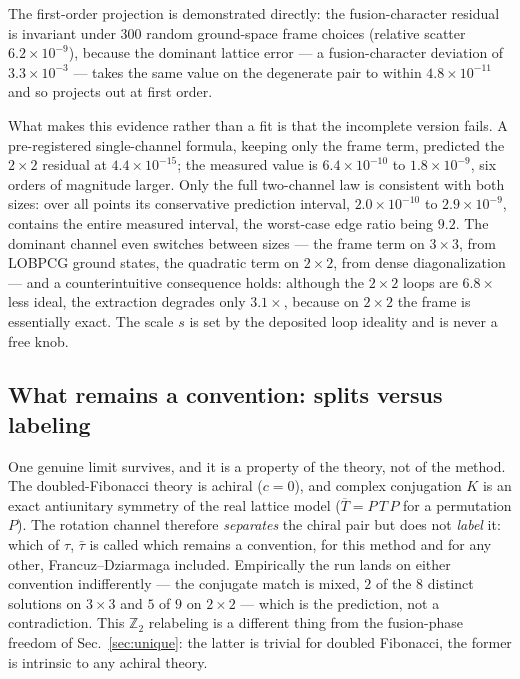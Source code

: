 \documentclass[aps,pra,twocolumn,superscriptaddress,longbibliography,floatfix,nofootinbib]{revtex4-2}
\begin{document}
The first-order projection is demonstrated directly: the fusion-character
residual is invariant under $300$ random ground-space frame choices (relative
scatter $6.2\times10^{-9}$), because the dominant lattice error --- a
fusion-character deviation of $3.3\times10^{-3}$ --- takes the same value on the
degenerate pair to within $4.8\times10^{-11}$ and so projects out at first
order.

What makes this evidence rather than a fit is that the incomplete version
fails. A pre-registered single-channel formula, keeping only the frame term,
predicted the $2\times2$ residual at $4.4\times10^{-15}$; the measured value is
$6.4\times10^{-10}$ to $1.8\times10^{-9}$, six orders of magnitude larger. Only
the full two-channel law is consistent with both sizes: over all points its
conservative prediction interval, $2.0\times10^{-10}$ to $2.9\times10^{-9}$,
contains the entire measured interval, the worst-case edge ratio being $9.2$.
The dominant channel even switches between sizes --- the frame term on
$3\times3$, from LOBPCG ground states, the quadratic term on $2\times2$, from
dense diagonalization --- and a counterintuitive consequence holds: although
the $2\times2$ loops are $6.8\times$ less ideal, the extraction degrades only
$3.1\times$, because on $2\times2$ the frame is essentially exact. The scale $s$
is set by the deposited loop ideality and is never a free knob.

\subsection{What remains a convention: splits versus labeling}
\label{sec:splits}

One genuine limit survives, and it is a property of the theory, not of the
method. The doubled-Fibonacci theory is achiral ($c=0$), and complex
conjugation $K$ is an exact antiunitary symmetry of the real lattice model
($\overline{T}=P\,T\,P$ for a permutation $P$). The rotation channel therefore
\emph{separates} the chiral pair but does not \emph{label} it: which of $\tau$,
$\bar\tau$ is called which remains a convention, for this method and for any
other, Francuz--Dziarmaga included. Empirically the run lands on either
convention indifferently --- the conjugate match is mixed, $2$ of the $8$
distinct solutions on $3\times3$ and $5$ of $9$ on $2\times2$ --- which is the
prediction, not a contradiction. This $\mathbb{Z}_2$ relabeling is a different
thing from the fusion-phase freedom of Sec.~\ref{sec:unique}: the latter is
trivial for doubled Fibonacci, the former is intrinsic to any achiral theory.
\end{document}
